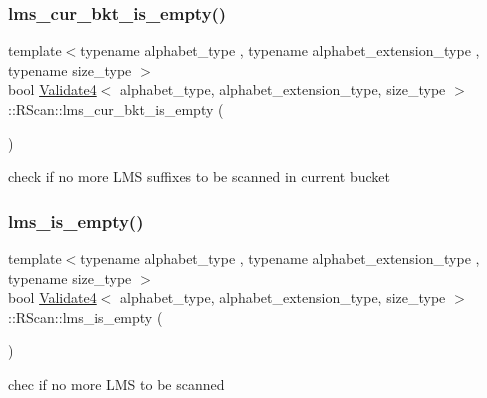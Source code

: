 \subsubsection{\texorpdfstring{lms\+\_\+cur\+\_\+bkt\+\_\+is\+\_\+empty()}{lms\_cur\_bkt\_is\_empty()}}
{\footnotesize\ttfamily template$<$typename alphabet\+\_\+type , typename alphabet\+\_\+extension\+\_\+type , typename size\+\_\+type $>$ \\
bool \hyperlink{class_validate4}{Validate4}$<$ alphabet\+\_\+type, alphabet\+\_\+extension\+\_\+type, size\+\_\+type $>$\+::R\+Scan\+::lms\+\_\+cur\+\_\+bkt\+\_\+is\+\_\+empty (\begin{DoxyParamCaption}{ }\end{DoxyParamCaption})\hspace{0.3cm}{\ttfamily [inline]}}



check if no more L\+MS suffixes to be scanned in current bucket 

\mbox{\label{struct_validate4_1_1_r_scan_ad24066012dd9441ffab435ce3f02424e}} 
\subsubsection{\texorpdfstring{lms\+\_\+is\+\_\+empty()}{lms\_is\_empty()}}
{\footnotesize\ttfamily template$<$typename alphabet\+\_\+type , typename alphabet\+\_\+extension\+\_\+type , typename size\+\_\+type $>$ \\
bool \hyperlink{class_validate4}{Validate4}$<$ alphabet\+\_\+type, alphabet\+\_\+extension\+\_\+type, size\+\_\+type $>$\+::R\+Scan\+::lms\+\_\+is\+\_\+empty (\begin{DoxyParamCaption}{ }\end{DoxyParamCaption})\hspace{0.3cm}{\ttfamily [inline]}}



chec if no more L\+MS to be scanned 

\mbox{\label{struct_validate4_1_1_r_scan_a963da6ae9411fca7fb05701dd678161f}} 
